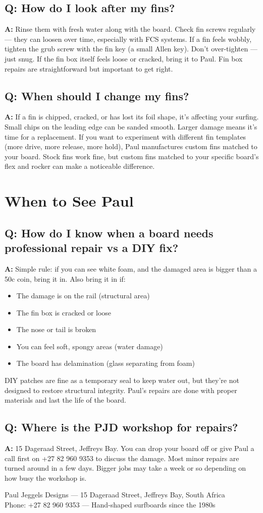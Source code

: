\documentclass[11pt,a4paper]{article}
\newcommand{\question}[1]{\subsection*{Q: #1}}
\newcommand{\answer}{\noindent\textbf{A:} }
\begin{document}
\question{How do I look after my fins?}
\answer Rinse them with fresh water along with the board. Check fin screws regularly --- they can loosen over time, especially with FCS systems. If a fin feels wobbly, tighten the grub screw with the fin key (a small Allen key). Don't over-tighten --- just snug. If the fin box itself feels loose or cracked, bring it to Paul. Fin box repairs are straightforward but important to get right.

\question{When should I change my fins?}
\answer If a fin is chipped, cracked, or has lost its foil shape, it's affecting your surfing. Small chips on the leading edge can be sanded smooth. Larger damage means it's time for a replacement. If you want to experiment with different fin templates (more drive, more release, more hold), Paul manufactures custom fins matched to your board. Stock fins work fine, but custom fins matched to your specific board's flex and rocker can make a noticeable difference.

\section{When to See Paul}

\question{How do I know when a board needs professional repair vs a DIY fix?}
\answer Simple rule: if you can see white foam, and the damaged area is bigger than a 50c coin, bring it in. Also bring it in if:
\begin{itemize}[leftmargin=1.5em]
    \item The damage is on the rail (structural area)
    \item The fin box is cracked or loose
    \item The nose or tail is broken
    \item You can feel soft, spongy areas (water damage)
    \item The board has delamination (glass separating from foam)
\end{itemize}
DIY patches are fine as a temporary seal to keep water out, but they're not designed to restore structural integrity. Paul's repairs are done with proper materials and last the life of the board.

\question{Where is the PJD workshop for repairs?}
\answer 15 Dageraad Street, Jeffreys Bay. You can drop your board off or give Paul a call first on +27 82 960 9353 to discuss the damage. Most minor repairs are turned around in a few days. Bigger jobs may take a week or so depending on how busy the workshop is.

\vfill
\begin{center}
\small\color{gray}
Paul Jeggels Designs --- 15 Dageraad Street, Jeffreys Bay, South Africa\\
Phone: +27 82 960 9353 --- Hand-shaped surfboards since the 1980s
\end{center}
\end{document}
